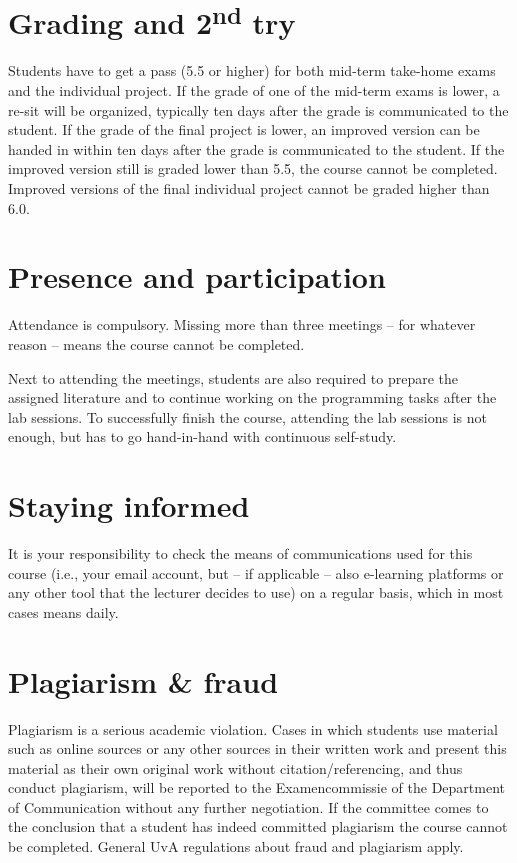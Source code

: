 \documentclass[a4paper,10pt,twocolumn]{report}
\begin{document}
\section{Grading and 2\textsuperscript{nd} try}
Students have to get a pass (5.5 or higher) for both mid-term take-home exams and the individual project. If the grade of one of the mid-term exams is lower, a re-sit will be organized, typically ten days after the grade is communicated to the student.
If the grade of the final project is lower, an improved version can be handed in within ten days after the grade is communicated to the student. If the improved version still is graded lower than 5.5, the course cannot be completed. Improved versions of the final individual project cannot be graded higher than 6.0.

\section{Presence and participation}
Attendance is compulsory. Missing more than three meetings – for whatever reason – means the course cannot be completed.

Next to attending the meetings, students are also required to prepare the assigned literature and to continue working on the programming tasks after the lab sessions. To successfully finish the course, attending the lab sessions is not enough, but has to go hand-in-hand with continuous self-study.

\section{Staying informed}
It is your responsibility to check the means of communications used for this course (i.e., your email account, but -- if applicable -- also e-learning platforms or any other tool that the lecturer decides to use) on a regular basis, which in most cases means daily.

\section{Plagiarism \& fraud}
Plagiarism is a serious academic violation. Cases in which students use material such as online sources or any other sources in their written work and present this material as their own original work without citation/referencing, and thus conduct plagiarism, will be reported to the Examencommissie of the Department of Communication without any further negotiation. If the committee comes to the conclusion that a student has indeed committed plagiarism the course cannot be completed.
General UvA regulations about fraud and plagiarism apply.
\end{document}
